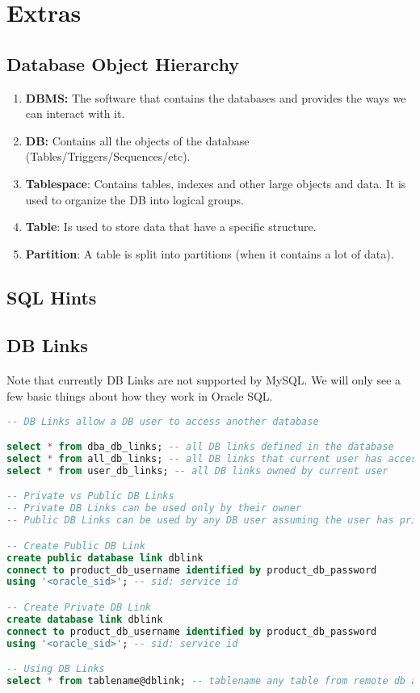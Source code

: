 
\section{Extras}
\subsection{Database Object Hierarchy}
\begin{enumerate}
	\item \textbf{\acs{DBMS}:} The software that contains the databases and provides the ways we can interact with it.
	\item \textbf{\acl{DB}:} Contains all the objects of the database (Tables/Triggers/Sequences/etc).
	\item \textbf{Tablespace}: Contains tables, indexes and other large objects and data. It is used to organize the \acs{DB} into logical groups.
	\item \textbf{Table}: Is used to store data that have a specific structure.
	\item \textbf{Partition}: A table is split into partitions (when it contains a lot of data).
\end{enumerate}
\subsection{SQL Hints}
\subsection{DB Links}
\paragraph{} Note that currently DB Links are not supported by MySQL. We will only see a few basic things about how they work in Oracle \acs{SQL}.
\begin{lstlisting}[language=SQL]
-- DB Links allow a DB user to access another database

select * from dba_db_links; -- all DB links defined in the database
select * from all_db_links; -- all DB links that current user has access to
select * from user_db_links; -- all DB links owned by current user

-- Private vs Public DB Links
-- Private DB Links can be used only by their owner
-- Public DB Links can be used by any DB user assuming the user has privileges to access the other database

-- Create Public DB Link
create public database link dblink
connect to product_db_username identified by product_db_password
using '<oracle_sid>'; -- sid: service id

-- Create Private DB Link
create database link dblink
connect to product_db_username identified by product_db_password
using '<oracle_sid>'; -- sid: service id

-- Using DB Links
select * from tablename@dblink; -- tablename any table from remote db and @ means what follows is a db link
\end{lstlisting}

